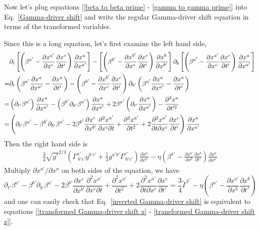 \documentclass[letterpaper,nofootinbib,prd,amsmath,onecolumn]{revtex4-1}
\begin{document}
Now let's plug equations [\ref{beta to beta prime} - \ref{gamma to gamma prime}] into Eq.~\ref{Gamma-driver shift} and write the regular Gamma-driver shift equation in terms of the transformed variables. 

Since this is a long equation, let's first examine the left hand side, 
\begin{align}
& \partial_{t}\left[\left(\beta^{a'} - \frac{\partial x^{a'}}{\partial x^{c}}\frac{\partial x^{c}}{\partial t'}\right)\frac{\partial x^{a}}{\partial x^{a'}}\right] - \left[\left(\beta^{b'} - \frac{\partial x^{b'}}{\partial x^{c}}\frac{\partial x^{c}}{\partial t'}\right)\frac{\partial x^{b}}{\partial x^{b'}}\right]\partial_{b}\left[\left(\beta^{a'} - \frac{\partial x^{a'}}{\partial x^{c}}\frac{\partial x^{c}}{\partial t'}\right)\frac{\partial x^{a}}{\partial x^{a'}}\right]\notag\\
= & \partial_{t}\left(\beta^{a'}\frac{\partial x^{a}}{\partial x^{a'}} - \frac{\partial x^{a}}{\partial t'}\right) - \left(\beta^{b'} - \frac{\partial x^{b'}}{\partial x^{c}}\frac{\partial x^{c}}{\partial t'}\right)\partial_{b'}\left(\beta^{a'}\frac{\partial x^{a}}{\partial x^{a'}} - \frac{\partial x^{a}}{\partial t'}\right)\notag\\
= & \left(\partial_{t'}\beta^{a'}\right)\frac{\partial x^{a}}{\partial x^{a'}} - \left(\beta^{b'}\partial_{b'}\beta^{a'}\right)\frac{\partial x^{a}}{\partial x^{a'}} + 2\beta^{a'}\left(\partial_{t'}\frac{\partial x^{a}}{\partial x^{a'}}\right) - \frac{\partial^{2}x^{a}}{\partial t'^{2}}\notag\\
= & \left(\partial_{t'}\beta^{a'} - \beta^{b'}\partial_{b'}\beta^{a'} - 2\beta^{b'}\frac{\partial x^{c}}{\partial x^{b'}}\frac{\partial^{2}x^{a'}}{\partial x^{c}\partial t} + \frac{\partial^{2} x^{a'}}{\partial t^{2}} + 2\frac{\partial^{2} x^{a'}}{\partial t\partial x^{c}}\frac{\partial x^{c}}{\partial t'}\right)\frac{\partial x^{a}}{\partial x^{a'}}
\end{align}
Then the right hand side is
\begin{align}
\frac{3}{4}\sqrt{g'}^{2/3}\left(\Gamma^{a'}_{~b'c'}g^{b'c'} + \frac{1}{3}g^{a'b'}\Gamma^{c'}_{~b'c'}\right)\frac{\partial x^{a}}{\partial x^{a'}} - \eta\left(\beta^{a'} - \frac{\partial x^{a'}}{\partial x^{b}}\frac{\partial x^{b}}{\partial t'}\right)\frac{\partial x^{a}}{\partial x^{a'}}
\end{align}
Multiply $\partial x^{a'}/\partial x^{a}$ on both sides of the equation, we have
\begin{equation}
\partial_{t'}\beta^{a'} - \beta^{b'}\partial_{b'}\beta^{a'} - 2\beta^{b'}\frac{\partial x^{c}}{\partial x^{b'}}\frac{\partial^{2}x^{a'}}{\partial x^{c}\partial t} + \frac{\partial^{2} x^{a'}}{\partial t^{2}} +  2\frac{\partial^{2} x^{a'}}{\partial t\partial x^{c}}\frac{\partial x^{c}}{\partial t'} = \frac{3}{4}{\tilde \Gamma}^{a'} - \eta\left(\beta^{a'} - \frac{\partial x^{a'}}{\partial x^{b}}\frac{\partial x^{b}}{\partial t'}\right)\label{inverted Gamma-driver shift}
\end{equation}
and one can easily check that Eq.~\ref{inverted Gamma-driver shift} is equivalent to equations [\ref{transformed Gamma-driver shift x} - \ref{transformed Gamma-driver shift z}].
\end{document}
